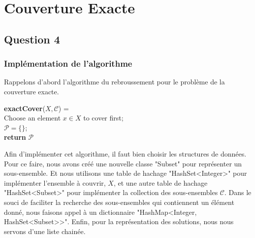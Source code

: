 \documentclass[a4paper,12pt]{article}
\begin{document}
	
	
\section{Couverture Exacte}

\subsection{Question 4}
\subsubsection{Implémentation de l'algorithme}
Rappelons d'abord l'algorithme\cite{dancinglinks} du rebroussement pour le problème de la couverture exacte.
\begin{algorithm}[ht]
	\textbf{exactCover}($X,\mathcal{C}$) = \\
	Choose an element $x\in X$ to cover first;\\
	$\mathcal{P}=\{\}$;\\
	\textbf{return} $\mathcal{P}$
\end{algorithm}

Afin d'implémenter cet algorithme, il faut bien choisir les structures de données. Pour ce faire, nous avons créé une nouvelle classe "Subset" pour représenter un sous-ensemble. Et nous utilisons une table de hachage "HashSet<Integer>" pour implémenter l'ensemble à couvrir, $X$, et une autre table de hachage "HashSet<Subset>" pour implémenter la collection des sous-ensembles  $\mathcal{C}$. Dans le souci de faciliter la recherche des sous-ensembles qui contiennent un élément donné, nous faisons appel à un dictionnaire "HashMap<Integer, HashSet<Subset>{>}". Enfin, pour la représentation des solutions, nous nous servons d'une liste chainée.
\end{document}
